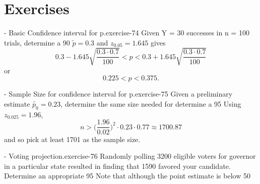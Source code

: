 \documentclass[10pt,]{book}
\numberwithin{equation}{section}
\newcommand{\lt}{<}
\newcommand{\gt}{>}
\begin{document}
\section[{Exercises}]{Exercises}\label{section-71}
\hypertarget{p-1149}{}%
\begin{inlineexercise}{- Basic Confidence interval for p.}{exercise-74}%
\hypertarget{p-1150}{}%
Given Y = 30 successes in n = 100 trials, determine a 90%
\hypertarget{p-1151}{}%
\(\tilde{p} = 0.3\) and \(z_{0.05} = 1.645\) gives%
\begin{equation*}
0.3 - 1.645 \sqrt{\frac{0.3 \cdot 0.7}{100}} \lt p \lt 0.3 + 1.645 \sqrt{\frac{0.3 \cdot 0.7}{100}}
\end{equation*}
or%
\begin{equation*}
0.225 \lt p \lt 0.375.
\end{equation*}
%
%
\end{inlineexercise}
 \begin{inlineexercise}{- Sample Size for confidence interval for p.}{exercise-75}%
\hypertarget{p-1152}{}%
Given a preliminary estimate \(\tilde{p_0} = 0.23\), determine the same size needed for determine a 95%
\hypertarget{p-1153}{}%
Using \(z_{0.025} = 1.96\),%
\begin{equation*}
n \gt \big ( \frac{1.96}{0.02} \big )^2 \cdot 0.23 \cdot 0.77 \approx 1700.87
\end{equation*}
and so pick at least 1701 as the sample size.%
%
\end{inlineexercise}
 \begin{inlineexercise}{- Voting projection.}{exercise-76}%
\hypertarget{p-1154}{}%
Randomly polling 3200 eligible voters for governor in a particular state resulted in finding that 1590 favored your candidate. Determine an appropriate 95%
\hypertarget{p-1155}{}%
Note that although the point estimate is below 50%
%
\end{inlineexercise}
\end{document}

